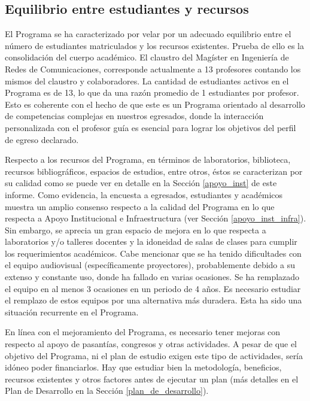 \subsection{Equilibrio entre estudiantes y recursos}

El Programa se ha caracterizado por velar por un adecuado equilibrio entre el número de estudiantes
matriculados y los recursos existentes. Prueba de ello es la consolidación del cuerpo académico. El
claustro del Magíster en Ingeniería de Redes de Comunicaciones, corresponde actualmente a
13 profesores contando los mismos del claustro y colaboradores. La cantidad de estudiantes 
activos en el Programa es de 13, lo que da una
razón promedio de 1 estudiantes por profesor. Esto es coherente con el hecho de que este es
un Programa orientado al desarrollo de competencias complejas en nuestros egresados, donde la
interacción personalizada con el profesor guía es esencial para lograr los objetivos del perfil
de egreso declarado.

Respecto a los recursos del Programa, en términos de laboratorios, biblioteca,
recursos bibliográficos, espacios de estudios, entre otros, éstos se caracterizan por su calidad
como se puede ver en detalle en la Sección \ref{apoyo_inst} de este informe. Como evidencia, la encuesta
a egresados, estudiantes y académicos muestra un amplio consenso respecto a la calidad del
Programa en lo que respecta a Apoyo Institucional e Infraestructura (ver Sección \ref{apoyo_inst_infra}). Sin
embargo, se aprecia un gran espacio de mejora en lo que respecta a laboratorios y/o talleres docentes
y la idoneidad de salas de clases para cumplir los requerimientos académicos. Cabe mencionar que se 
ha tenido dificultades con el equipo audiovisual (específicamente proyectores), probablemente 
debido a su extenso y constante uso, donde ha fallado en varias ocasiones. Se ha remplazado el equipo en al menos 
3 ocasiones en un periodo de 4 años. Es necesario estudiar el remplazo de estos equipos por una alternativa más duradera.
Esta ha sido una situación recurrente en el Programa.

En línea con el mejoramiento del Programa, es necesario tener mejoras con respecto al apoyo de
pasantías, congresos y otras actividades. A pesar de que el objetivo del Programa, ni el plan de
estudio exigen este tipo de actividades, sería idóneo poder financiarlos. Hay que estudiar bien 
la metodología, beneficios, recursos existentes y otros factores antes de ejecutar un plan 
(más detalles en el Plan de Desarrollo en la Sección \ref{plan_de_desarrollo}).

